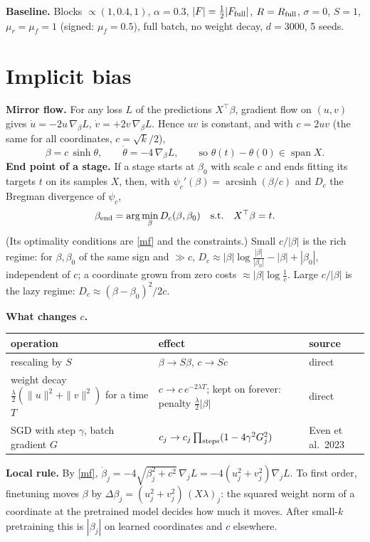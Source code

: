 \documentclass[10pt]{article}
\begin{document}
\textbf{Baseline.} Blocks $\propto(1,0.4,1)$, $\alpha=0.3$, $|F|=\frac12|F_{\rm full}|$, $R=R_{\rm full}$, $\sigma=0$, $S=1$, $\mu_r=\mu_f=1$ (signed: $\mu_f=0.5$), full batch, no weight decay, $d=3000$, 5 seeds.

\section{Implicit bias}
\textbf{Mirror flow.} For any loss $L$ of the predictions $X^\top\beta$, gradient flow on $(u,v)$ gives $\dot u=-2u\,\nabla_\beta L$, $\dot v=+2v\,\nabla_\beta L$. Hence $uv$ is constant, and with $c=2uv$ (the same for all coordinates, $c=\sqrt k/2$),
\begin{equation}\label{mf}
\beta=c\,\sinh\theta,\qquad\dot\theta=-4\,\nabla_\beta L,\qquad\text{so }\theta(t)-\theta(0)\in\operatorname{span}X .
\end{equation}
\textbf{End point of a stage.} If a stage starts at $\beta_0$ with scale $c$ and ends fitting its targets $t$ on its samples $X$, then, with $\psi_c'(\beta)=\operatorname{arcsinh}(\beta/c)$ and $D_c$ the Bregman divergence of $\psi_c$,
\begin{equation}\label{proj}
\beta_{\rm end}=\arg\min_\beta D_c(\beta,\beta_0)\quad\text{s.t.}\quad X^\top\beta=t .
\end{equation}
(Its optimality conditions are \eqref{mf} and the constraints.) Small $c/|\beta|$ is the rich regime: for $\beta,\beta_0$ of the same sign and $\gg c$, $D_c\approx|\beta|\log\frac{|\beta|}{|\beta_0|}-|\beta|+|\beta_0|$, independent of $c$; a coordinate grown from zero costs $\approx|\beta|\log\frac{1}{c}$. Large $c/|\beta|$ is the lazy regime: $D_c\approx(\beta-\beta_0)^2/2c$.

\textbf{What changes $c$.}
\begin{center}\small\begin{tabular}{@{}lll@{}}\toprule
operation & effect & source\\\midrule
rescaling by $S$ & $\beta\to S\beta$, $c\to Sc$ & direct\\
weight decay $\frac\lambda2(\|u\|^2+\|v\|^2)$ for a time $T$ & $c\to c\,e^{-2\lambda T}$; kept on forever: penalty $\frac\lambda2|\beta|$ & direct\\
SGD with step $\gamma$, batch gradient $G$ & $c_j\to c_j\prod_{\rm steps}(1-4\gamma^2G_j^2)$ & Even et al.\ 2023\\\bottomrule
\end{tabular}\end{center}
\textbf{Local rule.} By \eqref{mf}, $\dot\beta_j=-4\sqrt{\beta_j^2+c^2}\,\nabla_jL=-4(u_j^2+v_j^2)\nabla_jL$. To first order, finetuning moves $\beta$ by $\Delta\beta_j=(u_j^2+v_j^2)\,(X\lambda)_j$: the squared weight norm of a coordinate at the pretrained model decides how much it moves. After small-$k$ pretraining this is $|\beta_j|$ on learned coordinates and $c$ elsewhere.
\end{document}
